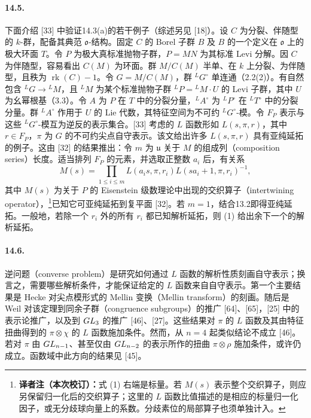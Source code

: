 \paragraph*{14.5.} 下面介绍 [33] 中验证14.3(a)的若干例子（综述另见 [18]）。设 $C$ 为分裂、伴随型的 $k$-群，配备其典范 $\mathfrak o$-结构。固定 $C$ 的 Borel 子群 $B$ 及 $B$ 的一个定义在 $\mathfrak o$ 上的极大环面 $T$。令 $P$ 为极大真标准抛物子群，$P=MN$ 为其标准 Levi 分解。因 $C$ 为伴随型，容易看出 $C(M)$ 为环面。群 $M/C(M)$ 半单、在 $k$ 上分裂、为伴随型，且秩为 $\operatorname{rk}(C)-1$。令 $G=M/C(M)$，群 ${}^LG^\circ$ 单连通（2.2(2)）。有自然包含 ${}^LG\to{}^LM$，且 ${}^LM$ 为某个标准抛物子群 ${}^LP={}^LM\cdot U$ 的 Levi 子群，其中 $U$ 为幺幂根基（3.3）。令 $A$ 为 $P$ 在 $T$ 中的分裂分量，${}^LA^\circ$ 为 ${}^LP^\circ$ 在 ${}^LT^\circ$ 中的分裂分量。群 ${}^LA^\circ$ 作用于 $U$ 的 Lie 代数，其特征空间为不可约 ${}^LG^\circ$-模。令 $F_P$ 表示与这些 ${}^LG^\circ$-模互为逆反的表示集合。[33] 考虑的 $L$ 函数形如 $L(s,\pi,r)$，其中 $r\in F_P$，$\pi$ 为 $G$ 的不可约尖点自守表示。该文给出许多 $L(s,\pi,r)$ 具有亚纯延拓的例子。这由 [32] 的结果推出：令 $m$ 为 $\mathfrak u$ 关于 $M$ 的组成列（composition series）长度。适当排列 $F_P$ 的元素，并选取正整数 $a_i$ 后，有关系
\begin{equation}
 M(s)=\prod_{1\leq i\leq m}L(a_i s,\pi,r_i)L(sa_i+1,\pi,r_i)^{-1},\tag{1}
\end{equation}
其中 $M(s)$ 为关于 $P$ 的 Eisenstein 级数理论中出现的交织算子（intertwining operator），\footnote{\textbf{译者注（本次校订）：}式 (1) 右端是标量。若 $M(s)$ 表示整个交织算子，则应另保留归一化后的交织算子；这里的 $L$ 函数比值描述的是相应的标量归一化因子，或无分歧球向量上的系数。分歧素位的局部算子也须单独计入。}已知它可亚纯延拓到复平面 [32]。若 $m=1$，结合13.2即得亚纯延拓。一般地，若除一个 $r_i$ 外的所有 $r_i$ 都已知解析延拓，则 (1) 给出余下一个的解析延拓。

\paragraph*{14.6.} 逆问题（converse problem）是研究如何通过 $L$ 函数的解析性质刻画自守表示；换言之，需要哪些解析条件，才能保证给定的 $L$ 函数来自自守表示。第一个主要结果是 Hecke 对尖点模形式的 Mellin 变换（Mellin transform）的刻画。随后是 Weil 对该定理到同余子群（congruence subgroups）的推广 [64]、[65]，[25] 中的表示论推广，以及到 $GL_3$ 的推广 [46]、[27]。这些结果对 $\pi$ 的 $L$ 函数及其由特征扭曲得到的 $\pi\otimes\chi$ 的 $L$ 函数施加条件。然而，从 $n=4$ 起类似结论不成立 [46]。若对 $\pi$ 由 $GL_{n-1}$、甚至仅由 $GL_{n-2}$ 的表示所作的扭曲 $\pi\otimes\rho$ 施加条件，或许仍成立。函数域中此方向的结果见 [45]。

